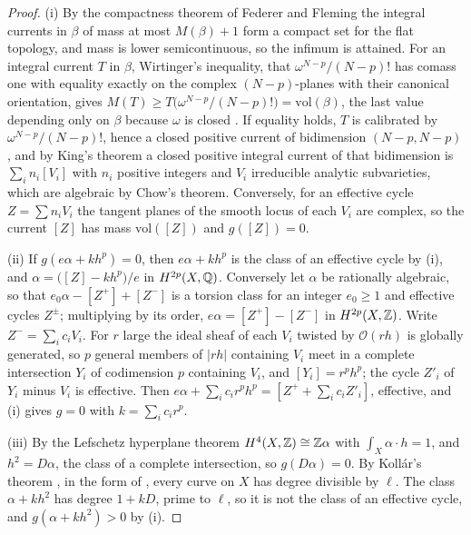 \begin{proof}
(i) By the compactness theorem of Federer and Fleming \cite{FF60} the integral currents in $\beta$ of mass at most $M(\beta)+1$ form a compact set for the flat topology, and mass is lower semicontinuous, so the infimum is attained. For an integral current $T$ in $\beta$, Wirtinger's inequality, that $\omega^{N-p}/(N-p)!$ has comass one with equality exactly on the complex $(N-p)$-planes with their canonical orientation, gives $M(T)\ge T\bigl(\omega^{N-p}/(N-p)!\bigr)=\mathrm{vol}(\beta)$, the last value depending only on $\beta$ because $\omega$ is closed \cite{HL82}. If equality holds, $T$ is calibrated by $\omega^{N-p}/(N-p)!$, hence a closed positive current of bidimension $(N-p,N-p)$ \cite{HL82}, and by King's theorem \cite{Kin71} a closed positive integral current of that bidimension is $\sum_{i}n_{i}[V_{i}]$ with $n_{i}$ positive integers and $V_{i}$ irreducible analytic subvarieties, which are algebraic by Chow's theorem. Conversely, for an effective cycle $Z=\sum n_{i}V_{i}$ the tangent planes of the smooth locus of each $V_{i}$ are complex, so the current $[Z]$ has mass $\mathrm{vol}([Z])$ and $g([Z])=0$.

(ii) If $g(e\alpha+kh^{p})=0$, then $e\alpha+kh^{p}$ is the class of an effective cycle by (i), and $\alpha=\bigl([Z]-kh^{p}\bigr)/e$ in $H^{2p}(X,\mathbb{Q})$. Conversely let $\alpha$ be rationally algebraic, so that $e_{0}\alpha-[Z^{+}]+[Z^{-}]$ is a torsion class for an integer $e_{0}\ge1$ and effective cycles $Z^{\pm}$; multiplying by its order, $e\alpha=[Z^{+}]-[Z^{-}]$ in $H^{2p}(X,\mathbb{Z})$. Write $Z^{-}=\sum_{i}c_{i}V_{i}$. For $r$ large the ideal sheaf of each $V_{i}$ twisted by $\mathcal{O}(rh)$ is globally generated, so $p$ general members of $|rh|$ containing $V_{i}$ meet in a complete intersection $Y_{i}$ of codimension $p$ containing $V_{i}$, and $[Y_{i}]=r^{p}h^{p}$; the cycle $Z'_{i}$ of $Y_{i}$ minus $V_{i}$ is effective. Then $e\alpha+\sum_{i}c_{i}r^{p}h^{p}=[Z^{+}+\sum_{i}c_{i}Z'_{i}]$, effective, and (i) gives $g=0$ with $k=\sum_{i}c_{i}r^{p}$.

(iii) By the Lefschetz hyperplane theorem $H^{4}(X,\mathbb{Z})\cong\mathbb{Z}\alpha$ with $\int_{X}\alpha\cdot h=1$, and $h^{2}=D\alpha$, the class of a complete intersection, so $g(D\alpha)=0$. By Koll\'ar's theorem \cite{Kol92}, in the form of \cite[Thm.~2]{SV05}, every curve on $X$ has degree divisible by $\ell$. The class $\alpha+kh^{2}$ has degree $1+kD$, prime to $\ell$, so it is not the class of an effective cycle, and $g(\alpha+kh^{2})>0$ by (i).
\end{proof}

